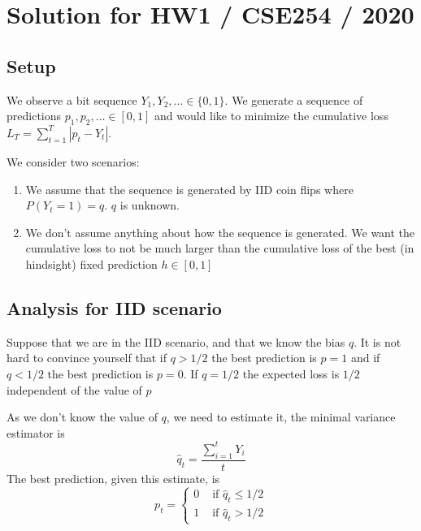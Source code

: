 \documentclass[10pt]{article}
\begin{document}
 
 
\section{Solution for HW1 / CSE254 / 2020}
\subsection{Setup}
We observe a bit sequence $Y_1,Y_2,\ldots \in \{0,1\}$. We generate a
sequence of predictions $p_1,p_2,\ldots \in [0,1]$ and would like to
minimize the cumulative loss $L_T = \sum_{t=1}^T |p_t - Y_t|$.

We consider two scenarios:
\begin{enumerate}
  \item We assume that the sequence is generated by IID coin flips
    where $P(Y_t=1) = q$. $q$ is unknown.
  \item We don't assume anything about how the sequence is
    generated. We want the cumulative loss to not be much larger than
    the cumulative loss of the best (in hindsight) fixed prediction $h
    \in [0,1]$
\end{enumerate}

\subsection{Analysis for IID scenario}
Suppose that we are in the IID scenario, and that we know the bias
$q$. It is not hard to convince yourself that if $q>1/2$ the best
prediction is $p=1$ and if $q<1/2$ the best prediction is $p=0$. If
$q=1/2$ the expected loss is $1/2$ independent of the value of $p$

As we don't know the value of $q$, we need to estimate it, the minimal
variance estimator is
\newcommand{\hq}{\hat{q}_t}
$$\hq = \frac{\sum_{i=1}^t Y_i}{t}$$
The best prediction, given this estimate, is
\[
  p_t =
  \begin{cases}
  0 & \mbox{ if }  \hq \leq 1/2 \\
  1 & \mbox{ if }  \hq > 1/2
  \end{cases}
\]
\end{document}
